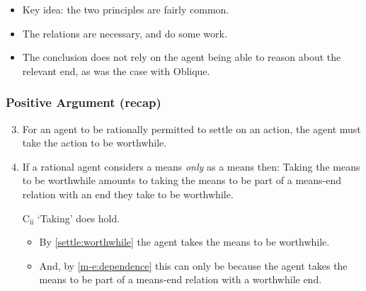 \documentclass[noamssymb,
]{beamer} %
\begin{document}
\begin{frame}
  \begin{itemize}
  \item Key idea: the two principles are fairly common.
  \item The relations are necessary, and do some work.
  \item The conclusion does not rely on the agent being able to reason about the relevant end, as was the case with Oblique.
  \end{itemize}
\end{frame}

\begin{frame}
  \frametitle{Positive Argument (recap)}

  \begin{enumerate}
    \setcounter{enumi}{2}
  \item\label{settle:worthwhile} For an agent to be rationally permitted to settle on an action, the agent must take the action to be worthwhile.
  \item\label{m-e:dependence} If a rational agent considers a means \emph{only} as a means then: \newline Taking the means to be worthwhile amounts to taking the means to be part of a means-end relation with an end they take to be worthwhile.
    \item[C\(_{\text{ii}}\)] `Taking' does hold.
    \begin{itemize}
    \item By \ref{settle:worthwhile} the agent takes the means to be worthwhile.
    \item And, by \ref{m-e:dependence} this can only be because the agent takes the means to be part of a means-end relation with a worthwhile end.
    \end{itemize}
  \end{enumerate}


\end{frame}
\end{document}
